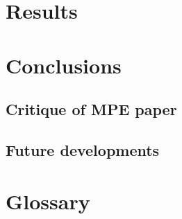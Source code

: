 \documentclass[mscthesis]{usiinfthesis}
\begin{document}
\chapter{Results}\label{chap:results}


\chapter{Conclusions}\label{chap:conclusions}

\section{Critique of MPE paper}

\section{Future developments}\label{sec:future-developments}



\appendix %


\backmatter

\chapter{Glossary} %

%
%



\end{document}

